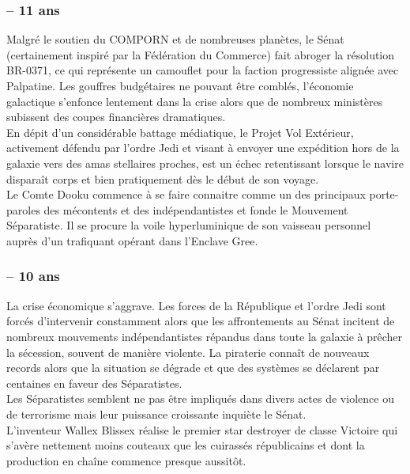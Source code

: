 \documentclass[twoside]{article}
\begin{document}
\subsubsection*{-- 11 ans} 
Malgré le soutien du COMPORN et de nombreuses planètes, le Sénat (certainement inspiré par la Fédération du Commerce) fait abroger la résolution BR-0371, ce qui représente un camouflet pour la faction progressiste alignée avec Palpatine. Les gouffres budgétaires ne pouvant être comblés, l'économie galactique s'enfonce lentement dans la crise alors que de nombreux ministères subissent des coupes financières dramatiques. \\

En dépit d'un considérable battage médiatique, le Projet Vol Extérieur, activement défendu par l'ordre Jedi et visant à envoyer une expédition hors de la galaxie vers des amas stellaires proches, est un échec retentissant lorsque le navire dispara\^{i}t corps et bien pratiquement dès le début de son voyage.\\

Le Comte Dooku commence à se faire connaitre comme un des principaux porte-paroles des mécontents et des indépendantistes et fonde le Mouvement Séparatiste. Il se procure la voile hyperluminique de son vaisseau personnel auprès d'un trafiquant opérant dans l'Enclave Gree.

\subsubsection*{-- 10 ans} 
La crise économique s'aggrave. Les forces de la République et l'ordre Jedi sont forcés d'intervenir constamment alors que les affrontements au Sénat incitent de nombreux mouvements indépendantistes répandus dans toute la galaxie à prêcher la sécession, souvent de manière violente. La piraterie conna\^{i}t de nouveaux records alors que la situation se dégrade et que des systèmes se déclarent par centaines en faveur des Séparatistes.\\

Les Séparatistes semblent ne pas être impliqués dans divers actes de violence ou de terrorisme mais leur puissance croissante inquiète le Sénat.\\

L'inventeur Wallex Blissex réalise le premier star destroyer de classe Victoire qui s'avère nettement moins couteaux que les cuirassés républicains et dont la production en cha\^{i}ne commence presque aussitôt.\\
\end{document}
